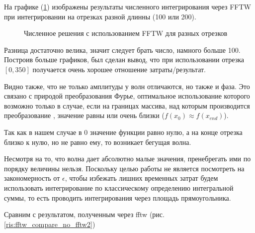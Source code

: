 \documentclass[14pt]{article}
\numberwithin{figure}{section}
\numberwithin{equation}{section}
\begin{document}
На графике (\ref{ris:fftw_compare}) изображены результаты численного интегрирования через FFTW при интегрировании на отрезках разной длинны (100 или 200). 

\begin{figure}[h]
	\caption{Численное решения с использованием FFTW для разных отрезков}
	\label{ris:fftw_compare}
\end{figure}

Разница достаточно велика, значит следует брать число, намного больше 100. Построив больше графиков, был сделан вывод, что при использовании отрезка $[0, 350]$ получается очень хорошее отношение затраты/результат.

Видно также, что не только амплитуды у волн отличаются, но также и фаза. Это связано с природой преобразования Фурье, оптимальное использование которого возможно только в случае, если на границах массива, над которым производится преобразование , значение равны или очень близки ($f(x_0) \approx f(x_{end})$).

Так как в нашем случае в 0 значение функции равно нулю, а на конце отрезка близко к нулю, но не равно ему, то возникает бегущая волна.

Несмотря на то, что волна дает абсолютно малые значения, пренебрегать ими по порядку величины нельзя. Поскольку целью работы не является посмотреть на закономерность от $\epsilon$, чтобы избежать лишних временных затрат будем использовать интегрирование по классическому определению интегральной суммы, то есть проводить интегрирования через площадь прямоугольника.\cite{nrc}

Сравним с результатом, полученным через fftw (рис. \ref{ris:fftw_compare_no_fftw2})
\end{document}

